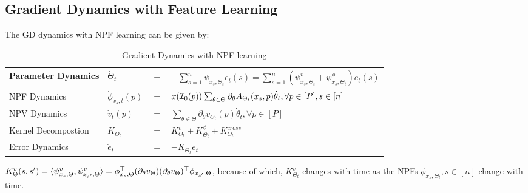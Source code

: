 \subsection{Gradient Dynamics with Feature Learning}
 The GD dynamics with NPF learning can be given by:
\FloatBarrier
\begin{table}[h]
\begin{tabular}{| l | lll |}\hline
Parameter Dynamics & $\dot{\Theta}_t$&$=$&$-\sum_{s=1}^n \psi_{x_s,\Theta_t}e_t(s)=\sum_{s=1}^n (\psi^v_{x_s,\Theta_t}+\psi^{\phi}_{x_s,\Theta_t})e_t(s)$\\\hline
NPF Dynamics& $\dot{\phi}_{x_s,t}(p)$&$=$&$x(\mathcal{I}_0(p))\sum_{\theta\in\Theta}\partial_{\theta}A_{\Theta_t}(x_s,p)\dot{\theta}_t,\forall p\in[P], s\in[n]$\\\hline
NPV Dynamics& $\dot{v}_t(p)$&$=$&$\sum_{\theta\in\Theta}\partial_{\theta}v_{\Theta_t}(p)\dot{\theta}_t,\forall p\in[P]$\\\hline
Kernel Decompostion& $K_{\Theta_t}$&$=$&$K^v_{\Theta_t}+K^{\phi}_{\Theta_t}+K^{cross}_{\Theta_t}$\\\hline
Error Dynamics& $\dot{e}_t$&$=$&$-K_{\Theta_t}e_t$\\\hline
\end{tabular}
\caption{Gradient Dynamics with NPF learning}
\label{tb:graddyna} 
\end{table}
$K^v_{\Theta}(s,s')=\langle \psi^v_{x_s,\Theta},\psi^v_{x_{s'},\Theta}\rangle=\phi^\top_{x_s,\Theta}(\partial_{\theta}v_{\Theta})(\partial_{\theta}v_{\Theta})^\top\phi_{x_{s'},\Theta}$, because of which, $K^v_{\Theta_t}$ changes with time as the NPFs  $\phi_{x_s,\Theta_t},s\in[n]$ change with time.  

